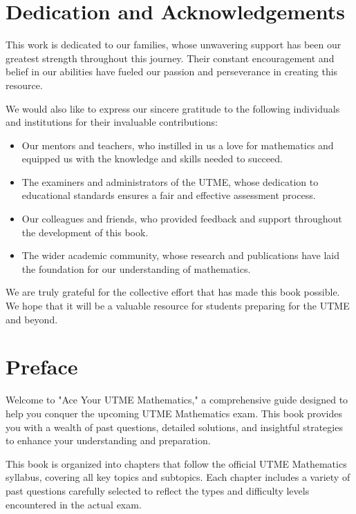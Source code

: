 \documentclass[10pt, a4paper]{book}
\begin{document}
\begin{frontmatter}
\chapter*{Dedication and Acknowledgements}

This work is dedicated to our families, whose unwavering support has been our greatest strength throughout this journey. Their constant encouragement and belief in our abilities have fueled our passion and perseverance in creating this resource.

We would also like to express our sincere gratitude to the following individuals and institutions for their invaluable contributions:
\begin{itemize}
\item Our mentors and teachers, who instilled in us a love for mathematics and equipped us with the knowledge and skills needed to succeed.
\item The examiners and administrators of the UTME, whose dedication to educational standards ensures a fair and effective assessment process.
\item  Our colleagues and friends, who provided feedback and support throughout the development of this book.
\item The wider academic community, whose research and publications have laid the foundation for our understanding of mathematics.
\end{itemize}

We are truly grateful for the collective effort that has made this book possible. We hope that it will be a valuable resource for students preparing for the UTME and beyond.

\clearpage

\tableofcontents

\chapter*{Preface}

Welcome to "Ace Your UTME Mathematics," a comprehensive guide designed to help you conquer the upcoming UTME Mathematics exam. This book provides you with a wealth of past questions, detailed solutions, and insightful strategies to enhance your understanding and preparation.

This book is organized into chapters that follow the official UTME Mathematics syllabus, covering all key topics and subtopics. Each chapter includes a variety of past questions carefully selected to reflect the types and difficulty levels encountered in the actual exam.


\end{frontmatter}
\end{document}
